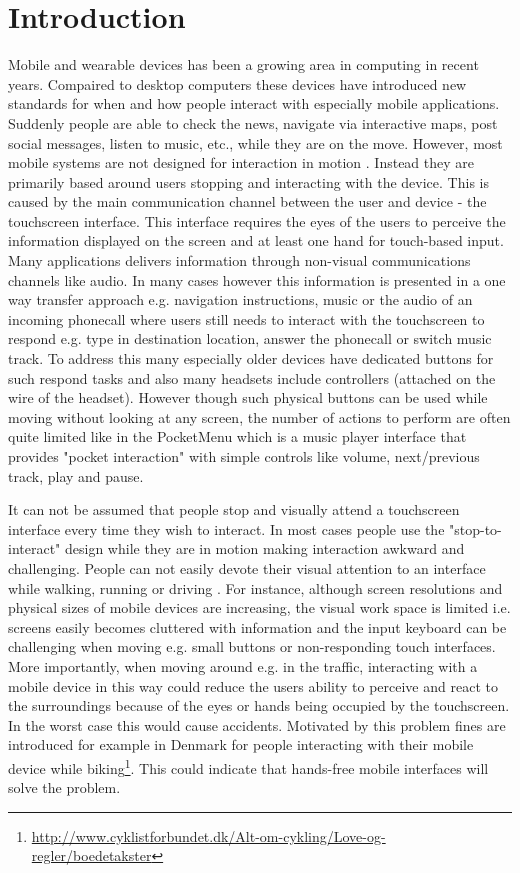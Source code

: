\chapter{Introduction}
Mobile and wearable devices has been a growing area in computing in recent years. Compaired to desktop computers these devices have introduced new standards for when and how people interact with especially mobile applications. Suddenly people are able to check the news, navigate via interactive maps, post social messages, listen to music, etc., while they are on the move. However, most mobile systems are not designed for interaction in motion \cite{marshall_mobile_2013}. Instead they are primarily based around users stopping and interacting with the device. This is caused by the main communication channel between the user and device - the touchscreen interface. This interface requires the eyes of the users to perceive the information displayed on the screen and at least one hand for touch-based input. Many applications delivers information through non-visual communications channels like audio. In many cases however this information is presented in a one way transfer approach e.g. navigation instructions, music or the audio of an incoming phonecall where users still needs to interact with the touchscreen to respond e.g. type in destination location, answer the phonecall or switch music track. To address this many especially older devices have dedicated buttons for such respond tasks and also many headsets include controllers (attached on the wire of the headset). However though such physical buttons can be used while moving without looking at any screen, the number of actions to perform are often quite limited like in the PocketMenu \cite{pielot_pocketmenu:_2012} which is a music player interface that provides "pocket interaction" with simple controls like volume, next/previous track, play and pause.

It can not be assumed that people stop and visually attend a touchscreen interface every time they wish to interact. In most cases people use the "stop-to-interact" design while they are in motion making interaction awkward and challenging. People can not easily devote their visual attention to an interface while walking, running or driving \cite{brewster_overcoming_2002}. For instance, although screen resolutions and physical sizes of mobile devices are increasing, the visual work space is limited i.e. screens easily becomes cluttered with information and the input keyboard can be challenging when moving e.g. small buttons or non-responding touch interfaces. More importantly, when moving around e.g. in the traffic, interacting with a mobile device in this way could reduce the users ability to perceive and react to the surroundings because of the eyes or hands being occupied by the touchscreen. In the worst case this would cause accidents. Motivated by this problem fines are introduced for example in Denmark for people interacting with their mobile device while biking\footnote{\url{http://www.cyklistforbundet.dk/Alt-om-cykling/Love-og-regler/boedetakster}}. This could indicate that hands-free mobile interfaces will solve the problem.


